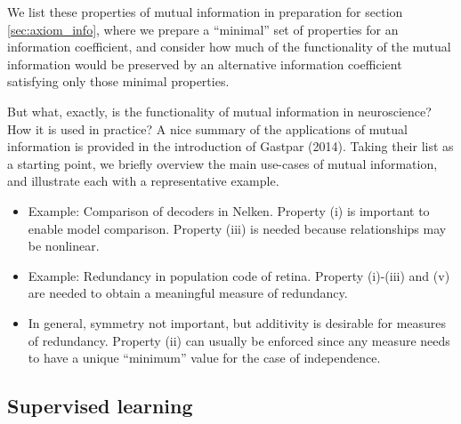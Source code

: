 \documentclass[12pt]{article}
\begin{document}
We list these properties of mutual information in preparation for
section \ref{sec:axiom_info}, where we prepare a ``minimal'' set of
properties for an information coefficient, and consider how much of
the functionality of the mutual information would be preserved by an
alternative information coefficient satisfying only those minimal
properties.

But what, exactly, is the functionality of mutual information in
neuroscience?  How it is used in practice?  A nice summary of the
applications of mutual information is provided in the introduction of
Gastpar (2014).  Taking their list as a starting point, we briefly
overview the main use-cases of mutual information, and illustrate each
with a representative example.



\begin{itemize}
\item Example: Comparison of decoders in Nelken.  
Property (i) is important to enable model comparison.  Property (iii)
is needed because relationships may be nonlinear.
\item Example: Redundancy in population code of retina.  
Property (i)-(iii) and (v) are needed to obtain a meaningful measure
of redundancy.
\item In general, symmetry not important, but additivity is desirable 
for measures of redundancy.  Property (ii) can usually be enforced
since any measure needs to have a unique ``minimum'' value for the
case of independence.
\end{itemize}

\subsection{Supervised learning}
\end{document}
